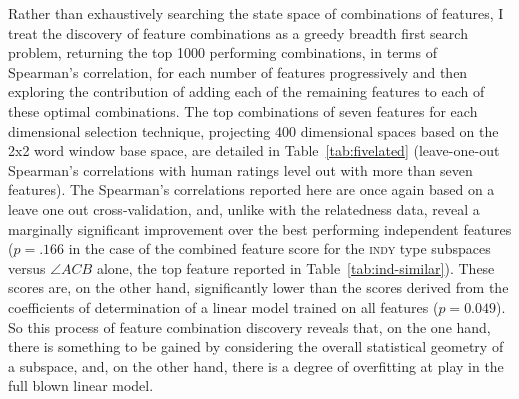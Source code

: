 Rather than exhaustively searching the state space of combinations of features, I treat the discovery of feature combinations as a greedy breadth first search problem, returning the top 1000 performing combinations, in terms of Spearman's correlation, for each number of features progressively and then exploring the contribution of adding each of the remaining features to each of these optimal combinations.  The top combinations of seven features for each dimensional selection technique, projecting 400 dimensional spaces based on the 2x2 word window base space, are detailed in Table~\ref{tab:fivelated} (leave-one-out Spearman's correlations with human ratings level out with more than seven features).  The Spearman's correlations reported here are once again based on a leave one out cross-validation, and, unlike with the relatedness data, reveal a marginally significant improvement over the best performing independent features ($p =.166$ in the case of the combined feature score for the \textsc{indy} type subspaces versus $\angle ACB$ alone, the top feature reported in Table~\ref{tab:ind-similar}).  These scores are, on the other hand, significantly lower than the scores derived from the coefficients of determination of a linear model trained on all features ($p = 0.049$).  So this process of feature combination discovery reveals that, on the one hand, there is something to be gained by considering the overall statistical geometry of a subspace, and, on the other hand, there is a degree of overfitting at play in the full blown linear model.

